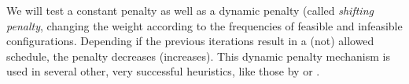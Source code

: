 \documentclass[a4paper,11pt]{article}
\begin{document}
We will test a constant penalty as well as a dynamic penalty (called \emph{shifting penalty}, changing the weight according to the frequencies of feasible and infeasible configurations. Depending if the previous iterations result in a (not) allowed schedule, the penalty decreases (increases). This dynamic penalty mechanism is used in several other, very successful heuristics, like those by \cite{Anagnostopoulos06} or \cite{Gaspero07}.

\small


\end{document}
